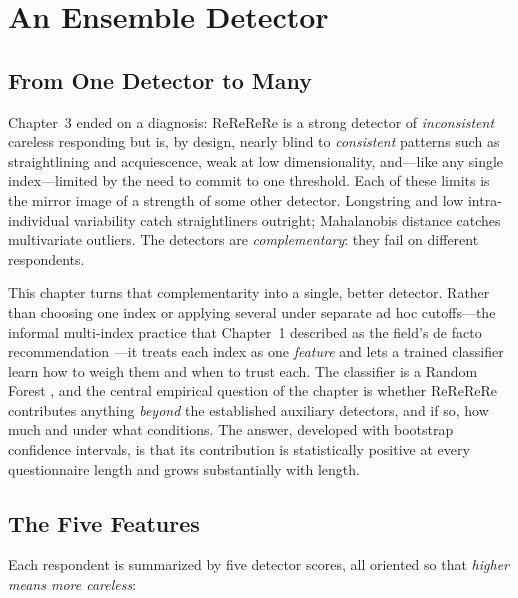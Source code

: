 \chapter{An Ensemble Detector}
\label{ch:ensemble}

\section{From One Detector to Many}

Chapter~3 ended on a diagnosis: ReReReRe is a strong detector of
\emph{inconsistent} careless responding but is, by design, nearly blind to
\emph{consistent} patterns such as straightlining and acquiescence, weak at low
dimensionality, and---like any single index---limited by the need to commit to
one threshold. Each of these limits is the mirror image of a strength of some
other detector. Longstring and low intra-individual variability catch
straightliners outright; Mahalanobis distance catches multivariate outliers.
The detectors are \emph{complementary}: they fail on different respondents.

This chapter turns that complementarity into a single, better detector. Rather
than choosing one index or applying several under separate ad hoc cutoffs---the
informal multi-index practice that Chapter~1 described as the field's de facto
recommendation \parencite{curran2016methods, ward2023dealing}---it treats each
index as one \emph{feature} and lets a trained classifier learn how to weigh
them and when to trust each. The classifier is a Random Forest
\parencite{breiman2001random}, and the central empirical question of the chapter
is whether ReReReRe contributes anything \emph{beyond} the established
auxiliary detectors, and if so, how much and under what conditions. The answer,
developed with bootstrap confidence intervals, is that its contribution is
statistically positive at every questionnaire length and grows substantially
with length.

\section{The Five Features}

Each respondent is summarized by five detector scores, all oriented so that
\emph{higher means more careless}:

